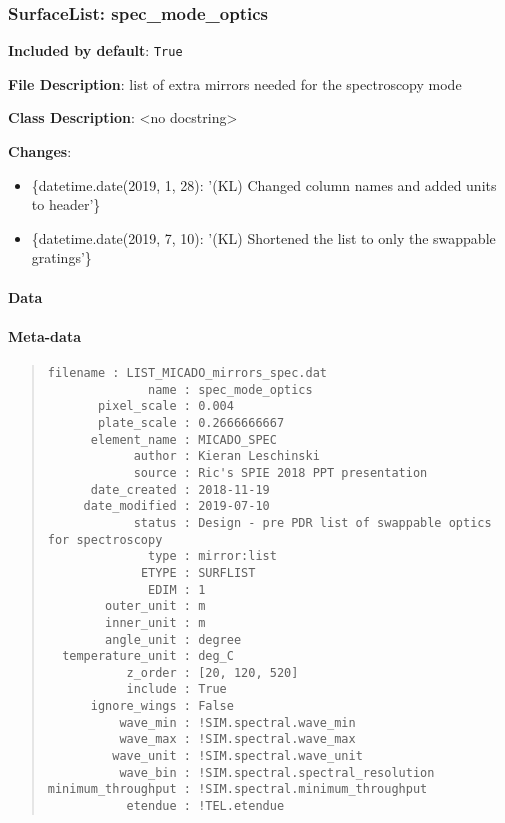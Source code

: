 \subsubsection{SurfaceList: \textquotedbl{}spec\_mode\_optics\textquotedbl{}%
  \label{surfacelist-spec-mode-optics}%
}

\textbf{Included by default}: \texttt{True}

\textbf{File Description}: list of extra mirrors needed for the spectroscopy mode

\textbf{Class Description}: <no docstring>

\textbf{Changes}:

\begin{itemize}
\item \{datetime.date(2019, 1, 28): '(KL) Changed column names and added units to header'\}

\item \{datetime.date(2019, 7, 10): '(KL) Shortened the list to only the swappable gratings'\}
\end{itemize}


\paragraph{Data%
  \label{data}%
}


\paragraph{Meta-data%
  \label{meta-data}%
}

\begin{quote}
\begin{alltt}
\begin{lstlisting}[frame=single]
          filename : LIST_MICADO_mirrors_spec.dat
              name : spec_mode_optics
       pixel_scale : 0.004
       plate_scale : 0.2666666667
      element_name : MICADO_SPEC
            author : Kieran Leschinski
            source : Ric's SPIE 2018 PPT presentation
      date_created : 2018-11-19
     date_modified : 2019-07-10
            status : Design - pre PDR list of swappable optics for spectroscopy
              type : mirror:list
             ETYPE : SURFLIST
              EDIM : 1
        outer_unit : m
        inner_unit : m
        angle_unit : degree
  temperature_unit : deg_C
           z_order : [20, 120, 520]
           include : True
      ignore_wings : False
          wave_min : !SIM.spectral.wave_min
          wave_max : !SIM.spectral.wave_max
         wave_unit : !SIM.spectral.wave_unit
          wave_bin : !SIM.spectral.spectral_resolution
minimum_throughput : !SIM.spectral.minimum_throughput
           etendue : !TEL.etendue
\end{lstlisting}
\end{alltt}
\end{quote}


